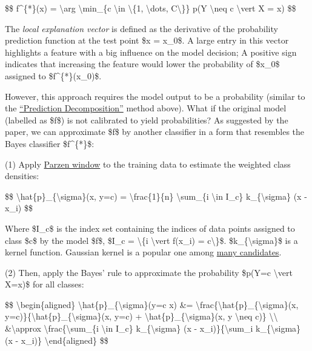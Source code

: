 \$\$ f\^{}\{*\}(x) = \textbackslash arg \textbackslash min\_\{c \textbackslash in \textbackslash\{1, \textbackslash dots, C\textbackslash\}\} p(Y \textbackslash neq c \textbackslash vert X = x) \$\$

The \emph{local explanation vector} is defined as the derivative of the probability prediction function at the test point \$x = x\_0\$. A large entry in this vector highlights a feature with a big influence on the model decision; A positive sign indicates that increasing the feature would lower the probability of \$x\_0\$ assigned to \$f\^{}\{*\}(x\_0)\$.

However, this approach requires the model output to be a probability (similar to the \href{https://lilianweng.github.io/posts/2017-08-01-interpretation/\#prediction-decomposition}{``Prediction Decomposition''} method above). What if the original model (labelled as \$f\$) is not calibrated to yield probabilities? As suggested by the paper, we can approximate \$f\$ by another classifier in a form that resembles the Bayes classifier \$f\^{}\{*\}\$:

(1) Apply \href{https://en.wikipedia.org/?title=Parzen_window&redirect=no}{Parzen window} to the training data to estimate the weighted class densities:

\$\$ \textbackslash hat\{p\}\_\{\textbackslash sigma\}(x, y=c) = \textbackslash frac\{1\}\{n\} \textbackslash sum\_\{i \textbackslash in I\_c\} k\_\{\textbackslash sigma\} (x - x\_i) \$\$

Where \$I\_c\$ is the index set containing the indices of data points assigned to class \$c\$ by the model \$f\$, \$I\_c = \textbackslash\{i \textbackslash vert f(x\_i) = c\textbackslash\}\$. \$k\_\{\textbackslash sigma\}\$ is a kernel function. Gaussian kernel is a popular one among \href{https://en.wikipedia.org/wiki/Kernel_(statistics)\#Kernel_functions_in_common_use}{many candidates}.

(2) Then, apply the Bayes' rule to approximate the probability \$p(Y=c \textbackslash vert X=x)\$ for all classes:

\$\$ \textbackslash begin\{aligned\} \textbackslash hat\{p\}\_\{\textbackslash sigma\}(y=c \textbar{} x) \&= \textbackslash frac\{\textbackslash hat\{p\}\_\{\textbackslash sigma\}(x, y=c)\}\{\textbackslash hat\{p\}\_\{\textbackslash sigma\}(x, y=c) + \textbackslash hat\{p\}\_\{\textbackslash sigma\}(x, y \textbackslash neq c)\} \textbackslash\textbackslash{} \&\textbackslash approx \textbackslash frac\{\textbackslash sum\_\{i \textbackslash in I\_c\} k\_\{\textbackslash sigma\} (x - x\_i)\}\{\textbackslash sum\_i k\_\{\textbackslash sigma\} (x - x\_i)\} \textbackslash end\{aligned\} \$\$

